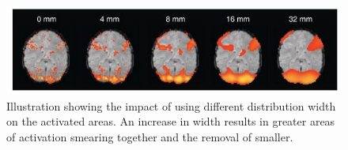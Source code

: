 \begin{figure}[H]                 
	\includegraphics[width=.8\textwidth]{figures/aBackground/smooth}  
	\caption{Illustration showing the impact of using different distribution width on the activated areas. An increase in width results in greater areas of activation smearing together and the removal of smaller.\cite{Poldrack2011}}
	\label{fig:back:smooth} 
\end{figure}  


